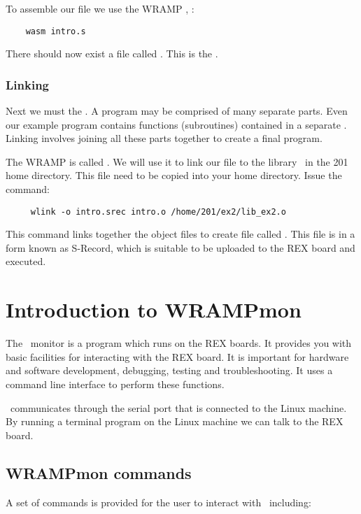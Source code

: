 To assemble our file we use the WRAMP , :
\begin{verbatim}
    wasm intro.s
\end{verbatim}

There should now exist a file called .  This is the 
.

\subsubsection{Linking}
Next we must  the .  A program may be
comprised of many separate parts.  Even our example program contains
functions (subroutines) contained in a separate . Linking
involves joining all these parts together to create a final program.

The WRAMP  is called .  We will use it to
link our file to the library \LIBEXTWO\ in the 201 home directory.
This file  need to be copied into your home directory.
Issue the command:
\begin{verbatim}
     wlink -o intro.srec intro.o /home/201/ex2/lib_ex2.o
\end{verbatim}

This command links together the object files to create file called
.  This file is in a form known as S-Record, which
is suitable to be uploaded to the REX board and executed.

%
%
%
\section{Introduction to WRAMPmon}
\label{intro:wrampmon}

The \WRAMPmon\ monitor is a program which runs on the REX boards.  It
provides you with basic facilities for interacting with the REX board.
It is important for hardware and software development, debugging,
testing and troubleshooting.  It uses a command line interface to
perform these functions.

\WRAMPmon\ communicates through the serial port that is connected to the Linux 
machine.  By running a terminal program on the Linux machine we can talk
to the REX board.


\subsection{WRAMPmon commands}
A set of commands is provided for the user to interact with \WRAMPmon\
including:

